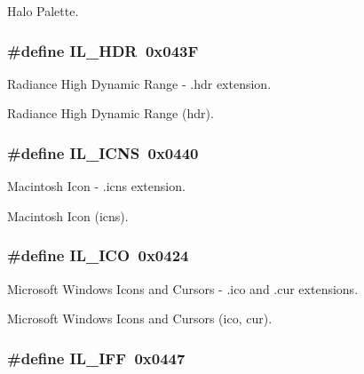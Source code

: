 Halo Palette. \hypertarget{group__il__formats_ga5d64125750873e31db8f469b771d88a7}{
\subsubsection[{I\+L\+\_\+\+H\+D\+R}]{\setlength{\rightskip}{0pt plus 5cm}\#define I\+L\+\_\+\+H\+D\+R~0x043\+F}}\label{group__il__formats_ga5d64125750873e31db8f469b771d88a7}


Radiance High Dynamic Range -\/ .hdr extension. 

Radiance High Dynamic Range (hdr). \hypertarget{group__il__formats_ga9409add4fd49dc5a8d719e8cc2b2a2de}{
\subsubsection[{I\+L\+\_\+\+I\+C\+N\+S}]{\setlength{\rightskip}{0pt plus 5cm}\#define I\+L\+\_\+\+I\+C\+N\+S~0x0440}}\label{group__il__formats_ga9409add4fd49dc5a8d719e8cc2b2a2de}


Macintosh Icon -\/ .icns extension. 

Macintosh Icon (icns). \hypertarget{group__il__formats_ga96a36b5af19520c4e176e3c2706420ae}{
\subsubsection[{I\+L\+\_\+\+I\+C\+O}]{\setlength{\rightskip}{0pt plus 5cm}\#define I\+L\+\_\+\+I\+C\+O~0x0424}}\label{group__il__formats_ga96a36b5af19520c4e176e3c2706420ae}


Microsoft Windows Icons and Cursors -\/ .ico and .cur extensions. 

Microsoft Windows Icons and Cursors (ico, cur). \hypertarget{group__il__formats_ga24e25a541ecc79265ec876702a42cc8c}{
\subsubsection[{I\+L\+\_\+\+I\+F\+F}]{\setlength{\rightskip}{0pt plus 5cm}\#define I\+L\+\_\+\+I\+F\+F~0x0447}}\label{group__il__formats_ga24e25a541ecc79265ec876702a42cc8c}


